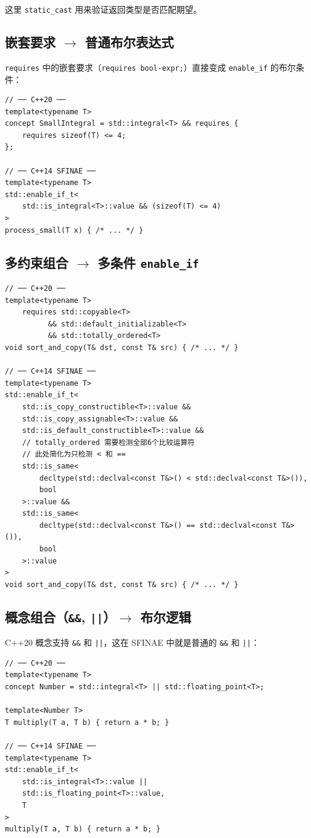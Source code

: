 \documentclass[12pt,a4paper,fontset=fandol]{ctexbook}
\begin{document}
这里 \texttt{static\_cast} 用来验证返回类型是否匹配期望。

\subsection{嵌套要求 $\to$ 普通布尔表达式}

\texttt{requires} 中的嵌套要求（\texttt{requires bool-expr;}）直接变成 \texttt{enable\_if} 的布尔条件：

\begin{lstlisting}
// ── C++20 ──
template<typename T>
concept SmallIntegral = std::integral<T> && requires {
    requires sizeof(T) <= 4;
};

// ── C++14 SFINAE ──
template<typename T>
std::enable_if_t<
    std::is_integral<T>::value && (sizeof(T) <= 4)
>
process_small(T x) { /* ... */ }
\end{lstlisting}

\subsection{多约束组合 $\to$ 多条件 \texttt{enable\_if}}

\begin{lstlisting}
// ── C++20 ──
template<typename T>
    requires std::copyable<T>
          && std::default_initializable<T>
          && std::totally_ordered<T>
void sort_and_copy(T& dst, const T& src) { /* ... */ }

// ── C++14 SFINAE ──
template<typename T>
std::enable_if_t<
    std::is_copy_constructible<T>::value &&
    std::is_copy_assignable<T>::value &&
    std::is_default_constructible<T>::value &&
    // totally_ordered 需要检测全部6个比较运算符
    // 此处简化为只检测 < 和 ==
    std::is_same<
        decltype(std::declval<const T&>() < std::declval<const T&>()),
        bool
    >::value &&
    std::is_same<
        decltype(std::declval<const T&>() == std::declval<const T&>()),
        bool
    >::value
>
void sort_and_copy(T& dst, const T& src) { /* ... */ }
\end{lstlisting}

\subsection{概念组合（\texttt{\&\&}, \texttt{||}）$\to$ 布尔逻辑}

C++20 概念支持 \texttt{\&\&} 和 \texttt{||}，这在 SFINAE 中就是普通的 \texttt{\&\&} 和 \texttt{||}：

\begin{lstlisting}
// ── C++20 ──
template<typename T>
concept Number = std::integral<T> || std::floating_point<T>;

template<Number T>
T multiply(T a, T b) { return a * b; }

// ── C++14 SFINAE ──
template<typename T>
std::enable_if_t<
    std::is_integral<T>::value ||
    std::is_floating_point<T>::value,
    T
>
multiply(T a, T b) { return a * b; }
\end{lstlisting}
\end{document}

